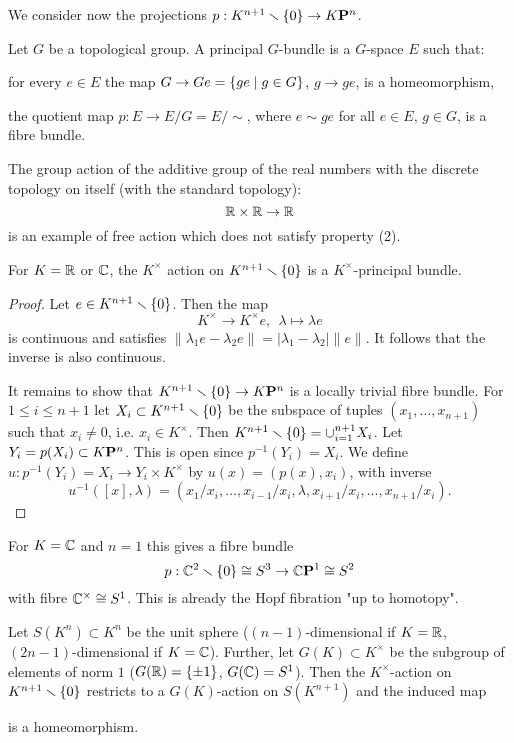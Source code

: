 We consider now the projections $p:K^{n+1}\smallsetminus\{0\}\to{K\mathbf{P}^n}$.

Let $G$ be a topological group. A principal $G$-bundle is a $G$-space $E$ such that:
\begin{numerate}
    \item for every $e\in E$ the map $G\to Ge=\{ge\mid g\in G\}$, $g\to ge$, is a homeomorphism,
    \item the quotient map $p:E\to E/G=E/\sim$, where $e\sim ge$ for all $e\in E$, $g\in G$, is a fibre bundle.
\end{numerate}

\begin{example}
The group action of the additive group of the real numbers with the discrete topology on itself (with the standard topology):
\[{\mathbb R}\times{\mathbb R}\to{\mathbb R}\]
is an example of free action which does not satisfy property (2).
\end{example}

\begin{proposition}
 For $K={\mathbb R}$ or $\mathbb{C}$, the $K^\times$ action on $K^{n+1}\smallsetminus\{0\}$ is a $K^\times$-principal bundle.
\end{proposition}

\begin{proof}
Let $e\in K^{n+1}\smallsetminus\{0\}$. Then the map
\[K^\times\to K^\times e,\ \ \lambda\mapsto\lambda e\]
is continuous and satisfies $\|\lambda_1 e-\lambda_2 e\|=|\lambda_1-\lambda_2|\|e\|$. It follows that the inverse is also continuous.

It remains to show that $K^{n+1}\smallsetminus\{0\}\to {K\mathbf{P}^n}$ is a locally trivial fibre bundle. For $1\leq i\leq n+1$ let $X_i\subset K^{n+1}\smallsetminus\{0\}$ be the subspace of tuples $(x_1,\dots,x_{n+1})$ such that $x_i\neq 0$, i.e. $x_i\in K^\times$. Then $K^{n+1}\smallsetminus\{0\}=\cup_{i=1}^{n+1}X_i$. Let $Y_i=p(X_i)\subset {K\mathbf{P}^n}$. This is open since $p^{-1}(Y_i)=X_i$. We define $u:p^{-1}(Y_i)=X_i\to Y_i\times K^\times$ by $u(x)=(p(x),x_i)$, with inverse
\[u^{-1}([x],\lambda)=(x_1/x_i,\dots,x_{i-1}/x_i,\lambda,x_{i+1}/x_i,\dots,x_{n+1}/x_i).\]
\end{proof}

For $K=\mathbb{C}$ and $n=1$ this gives a fibre bundle
\[p:\mathbb{C}^2\smallsetminus\{0\}\cong S^3\to {\mathbb{C}\mathbf{P}^{1}}\cong S^2\]
with fibre $\mathbb{C}^\times\cong S^1$. This is already the Hopf fibration "up to homotopy".

Let $S(K^n)\subset K^n$ be the unit sphere ($(n-1)$-dimensional if $K={\mathbb R}$, $(2n-1)$-dimensional if $K=\mathbb{C}$). Further, let $G(K)\subset K^\times$ be the subgroup of elements of norm $1$ ($G({\mathbb R})=\{\pm1\}$, $G(\mathbb{C})=S^1$). Then the $K^\times$-action on $K^{n+1}\smallsetminus\{0\}$ restricts to a $G(K)$-action on $S(K^{n+1})$ and the induced map
\begin{center}
\end{center}
is a homeomorphism.

